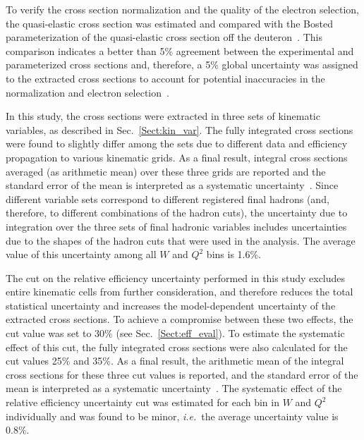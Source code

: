 \documentclass[prc,twocolumn,superscriptaddress,showpacs,amssymb,amsmath,amsfonts,aps,nofootinbib]{revtex4-1}
\begin{document}
To verify the cross section normalization and the quality of the electron selection, the quasi-elastic cross section was estimated and compared with the Bosted  parameterization of the quasi-elastic cross section off the deuteron~\cite{Bosted_fit,Bosted:2007xd}. This comparison indicates a better than 5\% agreement between the experimental and parameterized cross sections and, therefore, a 5\% global uncertainty was assigned to the extracted cross sections to account for potential inaccuracies in the normalization and electron selection~\cite{my_an_note:2020, my_thesis:2021}.




In this study, the cross sections were extracted in three sets of kinematic variables, as described in Sec.\!~\ref{Sect:kin_var}. The fully integrated cross sections were found to slightly differ among the sets due to different data and efficiency propagation to various kinematic grids. As a final result, integral cross sections averaged (as arithmetic mean) over these three grids are reported and the standard error of the mean is interpreted as a systematic uncertainty~\cite{my_an_note:2020, my_thesis:2021}. Since different variable sets correspond to different registered final hadrons (and, therefore, to different combinations of the hadron cuts), the uncertainty due to integration over the three sets of final hadronic variables includes uncertainties due to the shapes of the hadron cuts that were used in the analysis. The average value of this uncertainty among all $W$ and $Q^{2}$ bins is 1.6\%. 



The cut on the relative efficiency uncertainty performed in this study excludes entire kinematic cells from further consideration, and therefore reduces the total statistical uncertainty and increases the model-dependent uncertainty of the extracted cross sections. To achieve a compromise between these two effects, the cut value was set to 30\% (see Sec.\!~\ref{Sect:eff_eval}). To estimate the systematic effect of this cut, the fully integrated cross sections were also calculated for the cut values 25\% and 35\%. As a final result, the arithmetic mean of the integral cross sections for these three cut values is reported, and the standard error of the mean is interpreted as a systematic uncertainty~\cite{my_an_note:2020, my_thesis:2021}. The systematic effect of the relative efficiency uncertainty cut was estimated for each bin in $W$ and $Q^{2}$ individually and was found to be minor, {\it i.e.}~the average uncertainty value is 0.8\%. 
\end{document}
